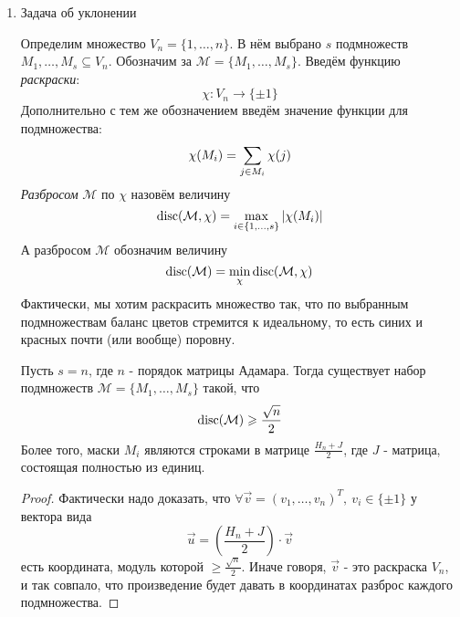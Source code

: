 \begin{enumerate}
	\item Задача об уклонении
	
	Определим множество $V_n = \{1, \ldots, n\}$. В нём выбрано $s$ подмножеств $M_1, \ldots, M_s \subseteq V_n$. Обозначим за $\mathcal{M} = \{M_1, \ldots, M_s\}$. Введём функцию \textit{раскраски}:
	\[
		\chi \colon V_n \to \{\pm 1\}
	\]
	Дополнительно с тем же обозначением введём значение функции для подмножества:
	\[
		\chi(M_i) = \sum\limits_{j \in M_i} \chi(j)
	\]
	\textit{Разбросом} $\mathcal{M}$ по $\chi$ назовём величину
	\[
		\operatorname{disc}(\mathcal{M}, \chi) = \max\limits_{i \in \{1, \ldots, s\}} |\chi(M_i)|
	\]
	А разбросом $\mathcal{M}$ обозначим величину
	\[
		\operatorname{disc}(\mathcal{M}) = \min\limits_{\chi} \operatorname{disc} (\mathcal{M}, \chi)
	\]
	Фактически, мы хотим раскрасить множество так, что по выбранным подмножествам баланс цветов стремится к идеальному, то есть синих и красных почти (или вообще) поровну.
	
	\begin{theorem}
		Пусть $s = n$, где $n$ - порядок матрицы Адамара. Тогда существует набор подмножеств $\mathcal{M} = \{M_1, \ldots, M_s\}$ такой, что
		\[
			\operatorname{disc}(\mathcal{M}) \geqslant \frac{\sqrt{n}}{2}
		\]
		Более того, маски $M_i$ являются строками в матрице $\frac{H_n + J}{2}$, где $J$ - матрица, состоящая полностью из единиц.
	\end{theorem}

	\begin{proof}
		Фактически надо доказать, что $\forall \vec{v} = (v_1, \ldots, v_n)^T,\ v_i \in \{\pm 1\}$ у вектора вида
		\[
			\vec{u} = \left(\frac{H_n + J}{2}\right) \cdot \vec{v}
		\]
		есть координата, модуль которой $\ge \frac{\sqrt{n}}{2}$. Иначе говоря, $\vec{v}$ - это раскраска $V_n$, и так совпало, что произведение будет давать в координатах разброс каждого подмножества.
		

\end{proof}
\end{enumerate}
